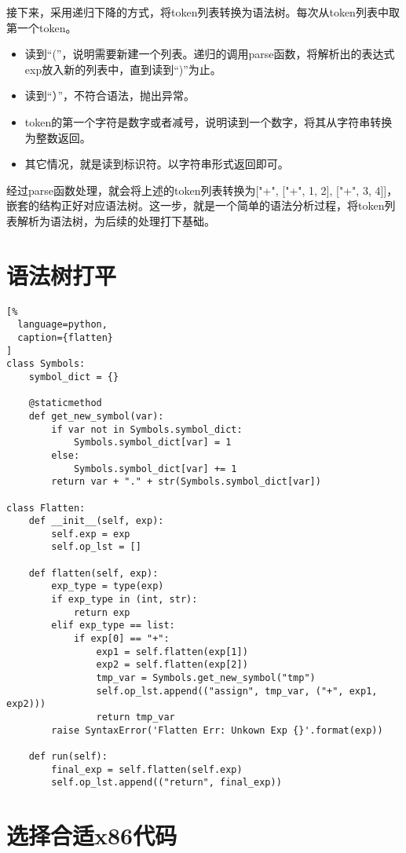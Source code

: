 接下来，采用递归下降的方式，将token列表转换为语法树。每次从token列表中取第一个token。
\begin{itemize}
  \item 读到“(”，说明需要新建一个列表。递归的调用parse函数，将解析出的表达式exp放入新的列表中，直到读到“)”为止。
  \item 读到“）”，不符合语法，抛出异常。
  \item token的第一个字符是数字或者减号，说明读到一个数字，将其从字符串转换为整数返回。
  \item 其它情况，就是读到标识符。以字符串形式返回即可。
\end{itemize}

经过parse函数处理，就会将上述的token列表转换为["+", ["+", 1, 2], ["+", 3, 4]]，嵌套的结构正好对应语法树。这一步，就是一个简单的语法分析过程，将token列表解析为语法树，为后续的处理打下基础。

\section{语法树打平}

\begin{lstlisting}[%
  language=python,
  caption={flatten}
]
class Symbols:
    symbol_dict = {}

    @staticmethod
    def get_new_symbol(var):
        if var not in Symbols.symbol_dict:
            Symbols.symbol_dict[var] = 1
        else:
            Symbols.symbol_dict[var] += 1
        return var + "." + str(Symbols.symbol_dict[var])

class Flatten:
    def __init__(self, exp):
        self.exp = exp
        self.op_lst = []
    
    def flatten(self, exp):
        exp_type = type(exp)
        if exp_type in (int, str):
            return exp
        elif exp_type == list:
            if exp[0] == "+":
                exp1 = self.flatten(exp[1])
                exp2 = self.flatten(exp[2])
                tmp_var = Symbols.get_new_symbol("tmp")
                self.op_lst.append(("assign", tmp_var, ("+", exp1, exp2)))
                return tmp_var
        raise SyntaxError('Flatten Err: Unkown Exp {}'.format(exp))

    def run(self):
        final_exp = self.flatten(self.exp)
        self.op_lst.append(("return", final_exp))
\end{lstlisting}


\section{选择合适x86代码}

